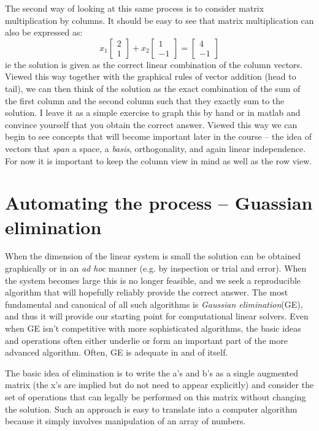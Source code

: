 \documentclass[11pt]{article}
\begin{document}
The second way of looking at this same process is to consider matrix multiplication by columns. It should be easy to see that matrix multiplication can also
be expressed as:
\[
x_1 
\begin{bmatrix}
2 \\
1
\end{bmatrix}
+
x_2
\begin{bmatrix}
1 \\
-1
\end{bmatrix}
= 
\begin{bmatrix}
4 \\
-1
\end{bmatrix}\]
ie the solution is given as the correct linear combination of the column vectors. Viewed this way together with the graphical rules of vector addition (head to tail), we can then think
of the solution as the exact combination of the sum of the first column and the second column such that they exactly sum to the solution. I leave it as a simple exercise to graph this
by hand or in matlab and convince yourself that you obtain the correct answer. Viewed this way we can begin to see concepts that will become important later in the course -- the
idea of vectors that {\it span} a space, a {\it basis}, orthogonality, and again linear independence. For now it is important to keep the column view in mind as well as the row view.

\section{Automating the process -- Guassian elimination}
When the dimension of the linear system is small the solution can be obtained graphically or in an {\it ad hoc} manner (e.g. by inspection or trial and error). When the system
becomes large this is no longer feasible, and we seek a reproducible algorithm that will hopefully reliably provide the correct answer. The most fundamental and canonical
of all such algorithms is {\it Gaussian elimination}(GE), and thus it will provide our starting point for computational linear solvers. Even when GE isn't competitive with more 
sophisticated algorithms, the basic ideas and operations often either underlie or form an important part of the more advanced algorithm. Often, GE is adequate in and of itself.

The basic idea of elimination is to write the a's and b's as a single augmented matrix (the x's are implied but do not need to appear explicitly) and consider the set of operations
that can legally be performed on this matrix without changing the solution. Such an approach is easy to translate into a computer algorithm because it simply involves manipulation
of an array of numbers.
\end{document}
